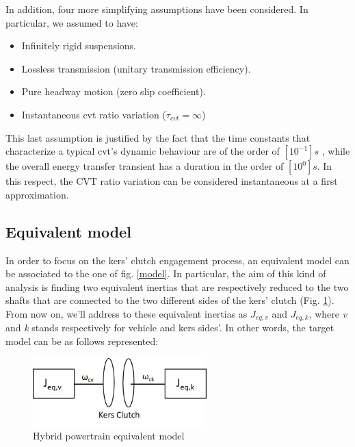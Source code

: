 \documentclass[11pt]{article}
\begin{document}
In addition, four more simplifying assumptions have been considered. In particular, we assumed to have: 

\begin{itemize}
	\item Infinitely rigid suspensions.
	\item Lossless transmission (unitary transmission efficiency).
	\item Pure headway motion (zero slip coefficient).
	\item Instantaneous cvt ratio variation ($\dot{\tau}_{cvt}=\infty$)
\end{itemize}

This last assumption is justified by the fact that the time constants that characterize a typical cvt's dynamic behaviour are of the order of $[10^{-1}] s$ \cite{o}, while the overall energy transfer transient has a duration in the order of $[10^0] s$. In this respect, the CVT ratio variation can be considered instantaneous at a first approximation.  
 
\newpage
 
\subsection{Equivalent model}

In order to focus on the kers' clutch engagement process, an equivalent model can be associated to the one of fig. \ref{model}. In particular, the aim of this kind of analysis is finding two equivalent inertias that are respectively reduced to the two shafts that are connected to the two different sides of the kers' clutch (Fig. \ref{eq_model}).
From now on, we'll address to these equivalent inertias as $J_{eq,v}$ and $J_{eq,k}$, where \textit{v} and \textit{k} stands respectively for vehicle and kers sides'.
In other words, the target model can be as follows represented:

\begin{figure}[H]
\centering
\includegraphics[width=0.6\textwidth]{Images/Model/Equivalent_model.jpg}
\caption{Hybrid powertrain equivalent model}
\label{eq_model}
\end{figure}
\end{document}
